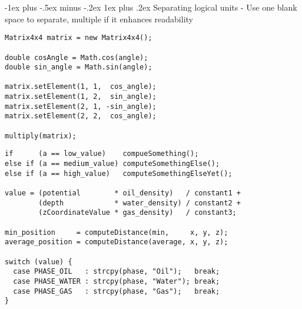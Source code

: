 \documentclass[10pt,landscape]{article}
\makeatletter
\renewcommand{\subsubsection}{\@startsection{subsubsection}{3}{0mm}%
                                {-1ex plus -.5ex minus -.2ex}%
                                {1ex plus .2ex}%
                                {\normalfont\small\bfseries}}
\makeatother
\begin{document}
\begin{multicols}{3}
\begin{tabular}{@{}ll@{}}
\end{tabular}

\subsubsection{Separating logical units}
- Use one blank space to separate, multiple if it enhances readability
\begin{verbatim}
Matrix4x4 matrix = new Matrix4x4();

double cosAngle = Math.cos(angle);
double sin_angle = Math.sin(angle);

matrix.setElement(1, 1,  cos_angle);
matrix.setElement(1, 2,  sin_angle);
matrix.setElement(2, 1, -sin_angle);
matrix.setElement(2, 2,  cos_angle);

multiply(matrix);

\end{verbatim}

\begin{verbatim}
if      (a == low_value)    compueSomething();
else if (a == medium_value) computeSomethingElse();
else if (a == high_value)   computeSomethingElseYet();

value = (potential        * oil_density)   / constant1 +
        (depth            * water_density) / constant2 +
        (zCoordinateValue * gas_density)   / constant3;

min_position     = computeDistance(min,     x, y, z);
average_position = computeDistance(average, x, y, z);

switch (value) {
  case PHASE_OIL   : strcpy(phase, "Oil");   break;
  case PHASE_WATER : strcpy(phase, "Water"); break;
  case PHASE_GAS   : strcpy(phase, "Gas");   break;
}
\end{verbatim}


\end{multicols}
\end{document}
